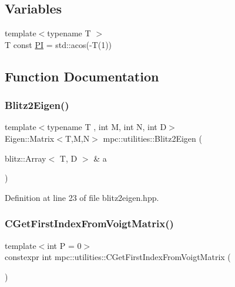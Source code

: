 \subsection*{Variables}
\begin{DoxyCompactItemize}
\item 
{\footnotesize template$<$typename T $>$ }\\T const \mbox{\hyperlink{namespacempc_1_1utilities_a9ebe3319659192350da76891a61820d0}{PI}} = std\+::acos(-\/T(1))
\end{DoxyCompactItemize}


\subsection{Function Documentation}
\mbox{\label{namespacempc_1_1utilities_afb1a22ab436781cf5a791680bc60988f}} 
\subsubsection{\texorpdfstring{Blitz2\+Eigen()}{Blitz2Eigen()}}
{\footnotesize\ttfamily template$<$typename T , int M, int N, int D$>$ \\
Eigen\+::\+Matrix$<$T,M,N$>$ mpc\+::utilities\+::\+Blitz2\+Eigen (\begin{DoxyParamCaption}\item[{blitz\+::\+Array$<$ T, D $>$ \&}]{a }\end{DoxyParamCaption})}



Definition at line 23 of file blitz2eigen.\+hpp.

\mbox{\label{namespacempc_1_1utilities_acb1091d4fd58c0821eeeba68a43146ac}} 
\subsubsection{\texorpdfstring{C\+Get\+First\+Index\+From\+Voigt\+Matrix()}{CGetFirstIndexFromVoigtMatrix()}}
{\footnotesize\ttfamily template$<$int P = 0$>$ \\
constexpr int mpc\+::utilities\+::\+C\+Get\+First\+Index\+From\+Voigt\+Matrix (\begin{DoxyParamCaption}{ }\end{DoxyParamCaption})\hspace{0.3cm}{\ttfamily [inline]}}



